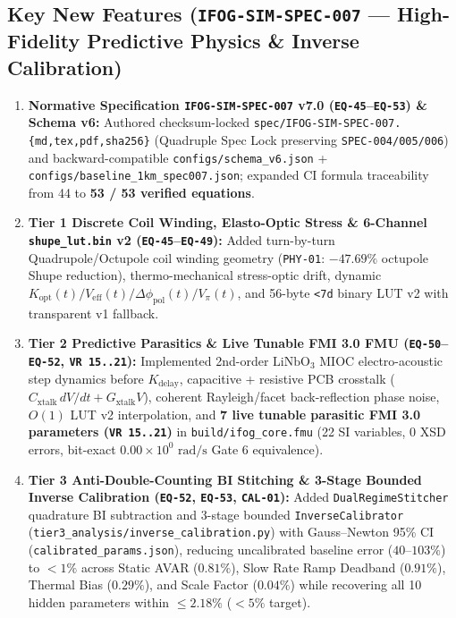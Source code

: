 \documentclass[11pt,a4paper]{article}
\begin{document}
\subsection{Key New Features (\texttt{IFOG-SIM-SPEC-007} --- High-Fidelity Predictive Physics \& Inverse Calibration)}
\begin{enumerate}
    \item \textbf{Normative Specification \texttt{IFOG-SIM-SPEC-007} v7.0 (\texttt{EQ-45}--\texttt{EQ-53}) \& Schema v6:}
    Authored checksum-locked \texttt{spec/IFOG-SIM-SPEC-007.\{md,tex,pdf,sha256\}} (Quadruple Spec Lock preserving \texttt{SPEC-004/005/006}) and backward-compatible \texttt{configs/schema\_v6.json} + \texttt{configs/baseline\_1km\_spec007.json}; expanded CI formula traceability from 44 to \textbf{53 / 53 verified equations}.
    \item \textbf{Tier 1 Discrete Coil Winding, Elasto-Optic Stress \& 6-Channel \texttt{shupe\_lut.bin} v2 (\texttt{EQ-45}--\texttt{EQ-49}):}
    Added turn-by-turn Quadrupole/Octupole coil winding geometry (\texttt{PHY-01}: $-47.69\%$ octupole Shupe reduction), thermo-mechanical stress-optic drift, dynamic $K_{\text{opt}}(t)/V_{\text{eff}}(t)/\Delta\phi_{\text{pol}}(t)/V_\pi(t)$, and 56-byte \texttt{<7d} binary LUT v2 with transparent v1 fallback.
    \item \textbf{Tier 2 Predictive Parasitics \& Live Tunable FMI 3.0 FMU (\texttt{EQ-50}--\texttt{EQ-52}, \texttt{VR 15..21}):}
    Implemented 2nd-order $\text{LiNbO}_3$ MIOC electro-acoustic step dynamics before $K_{\text{delay}}$, capacitive + resistive PCB crosstalk ($C_{\text{xtalk}}\,dV/dt + G_{\text{xtalk}}V$), coherent Rayleigh/facet back-reflection phase noise, $O(1)$ LUT v2 interpolation, and \textbf{7 live tunable parasitic FMI 3.0 parameters (\texttt{VR 15..21})} in \texttt{build/ifog\_core.fmu} (22 SI variables, 0 XSD errors, bit-exact $0.00\times 10^0\text{ rad/s}$ Gate 6 equivalence).
    \item \textbf{Tier 3 Anti-Double-Counting BI Stitching \& 3-Stage Bounded Inverse Calibration (\texttt{EQ-52}, \texttt{EQ-53}, \texttt{CAL-01}):}
    Added \texttt{DualRegimeStitcher} quadrature BI subtraction and 3-stage bounded \texttt{InverseCalibrator} (\texttt{tier3\_analysis/inverse\_calibration.py}) with Gauss--Newton 95\% CI (\texttt{calibrated\_params.json}), reducing uncalibrated baseline error ($40$--$103\%$) to \textbf{$< 1\%$} across Static AVAR ($0.81\%$), Slow Rate Ramp Deadband ($0.91\%$), Thermal Bias ($0.29\%$), and Scale Factor ($0.04\%$) while recovering all 10 hidden parameters within $\le 2.18\%$ ($< 5\%$ target).

\end{enumerate}
\end{document}
